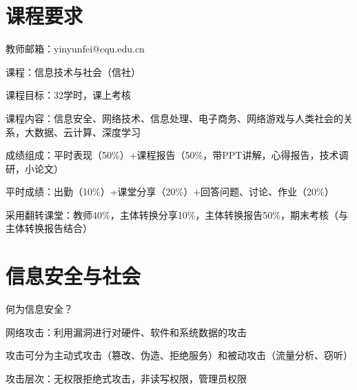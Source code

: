 \def\lecturer{尹云飞}
\def\noter{THF}
\def\className{Computer Science Technology and Society}
\def\term{III-B}



\maketitle
\tableofcontents
\section*{课程要求}%
\label{sec:课程要求}
教师邮箱：yinyunfei@cqu.edu.cn

课程：信息技术与社会（信社）

课程目标：32学时，课上考核

课程内容：信息安全、网络技术、信息处理、电子商务、网络游戏与人类社会的关系，大数据、云计算、深度学习

成绩组成：平时表现（50\%）+课程报告（50\%，带PPT讲解，心得报告，技术调研，小论文）

平时成绩：出勤（10\%）+课堂分享（20\%）+回答问题、讨论、作业（20\%）

采用翻转课堂：教师40\%，主体转换分享10\%，主体转换报告50\%，期末考核（与主体转换报告结合）

\section{信息安全与社会}%
\label{sec:信息安全与社会}
\begin{question}
    何为信息安全？
\end{question}
\begin{notation}
    网络攻击：利用漏洞进行对硬件、软件和系统数据的攻击
\end{notation}
攻击可分为主动式攻击（篡改、伪造、拒绝服务）和被动攻击（流量分析、窃听）

攻击层次：无权限拒绝式攻击，非读写权限，管理员权限















